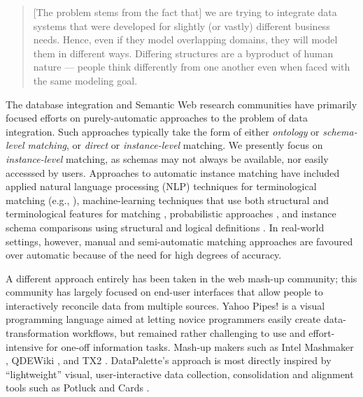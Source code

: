 \documentclass{sigchi}
\begin{document}
\begin{quote} 
  [The problem stems from the fact that] we are trying to integrate data systems that were developed for slightly (or vastly) different business needs. Hence, even if they model overlapping domains, they will model them in different ways. Differing structures are a byproduct of human nature --- people think differently from one another even when faced with the same modeling goal. \cite{alonhalevy}
\end{quote}

The database integration and Semantic Web \cite{Shadbolt:2006:SWR:1155313.1155373} research communities have primarily focused efforts on purely-automatic approaches to the problem of data integration.  Such approaches typically take the form of either \emph{ontology} or \emph{schema-level matching}, or \emph{direct} or \emph{instance-level} matching.  We presently focus  on \emph{instance-level} matching, as schemas may not always be available, nor easily accesssed by users. Approaches to automatic instance matching have included applied natural language processing (NLP) techniques for terminological matching (e.g., \cite{euzenat2004api}), machine-learning techniques that use both structural and terminological features for matching \cite{doan2003learning}, probabilistic approaches \cite{suchanek2011paris}, and instance schema comparisons using structural and logical definitions \cite{castano2006matching}.   In real-world settings, however, manual and semi-automatic matching approaches are favoured over automatic because of the need for high degrees of accuracy.  

A different approach entirely has been taken in the web mash-up community; this community has largely focused on end-user interfaces that allow people to interactively reconcile data from multiple sources.  Yahoo Pipes! is a visual programming language aimed at letting novice programmers easily create data-transformation workflows, but remained rather challenging to  use and effort-intensive for one-off information tasks.  Mash-up makers such as Intel Mashmaker \cite{}, QDEWiki \cite{}, and TX2 \cite{}. DataPalette's approach is most directly inspired by ``lightweight'' visual, user-interactive data collection, consolidation and alignment tools such as Potluck \cite{citeulike:3875264} and Cards \cite{Dontcheva:2007:RCS:1294211.1294224}.
\end{document}
